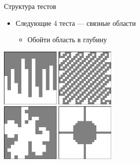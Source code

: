 \begin{frame}[t]{Структура тестов}
    \begin{itemize}
        \item Следующие 4 теста --- связные области
        \begin{itemize}
            \item Обойти область в глубину
        \end{itemize}
    \end{itemize}
    \vspace{-1em}
    \begin{center}
        \includegraphics[height=2.8cm]{cham02.png}
        \quad
        \includegraphics[height=2.8cm]{cham03.png}
        \\
        \includegraphics[height=2.8cm]{cham04.png}
        \quad
        \includegraphics[height=2.8cm]{cham05.png}
    \end{center}
\end{frame}
